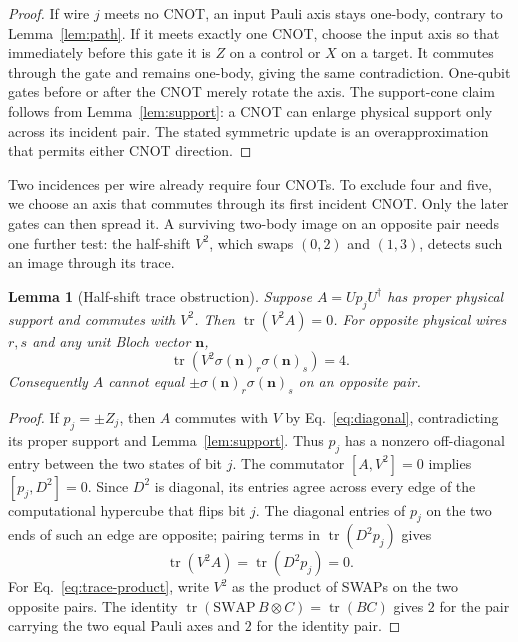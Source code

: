 \documentclass[11pt]{article}
\newtheorem{lemma}{Lemma}
\newcommand{\tr}{\operatorname{tr}}
\begin{document}
\begin{proof}
If wire $j$ meets no CNOT, an input Pauli axis stays one-body, contrary
to Lemma~\ref{lem:path}.  If it meets exactly one CNOT, choose the input
axis so that immediately before this gate it is $Z$ on a control or $X$
on a target.  It commutes through the gate and remains one-body, giving
the same contradiction.  One-qubit gates before or after the CNOT merely
rotate the axis.  The support-cone claim follows from
Lemma~\ref{lem:support}: a CNOT can enlarge physical support only across
its incident pair.  The stated symmetric update is an overapproximation
that permits either CNOT direction.
\end{proof}

Two incidences per wire already require four CNOTs. To exclude four and
five, we choose an axis that commutes through its first incident CNOT.
Only the later gates can then spread it. A surviving two-body image on
an opposite pair needs one further test: the half-shift $V^2$, which
swaps $(0,2)$ and $(1,3)$, detects such an image through its trace.

\begin{lemma}[Half-shift trace obstruction]\label{lem:trace}
Suppose $A=Up_jU^\dagger$ has proper physical support and commutes with
$V^2$.  Then $\tr(V^2A)=0$.  For opposite physical wires $r,s$ and any
unit Bloch vector $\mathbf n$,
\begin{equation}\label{eq:trace-product}
\tr\!\left(V^2\sigma(\mathbf n)_r\sigma(\mathbf n)_s\right)=4.
\end{equation}
Consequently $A$ cannot equal
$\pm\sigma(\mathbf n)_r\sigma(\mathbf n)_s$ on an opposite pair.
\end{lemma}

\begin{proof}
If $p_j=\pm Z_j$, then $A$ commutes with $V$ by
Eq.~\eqref{eq:diagonal}, contradicting its proper support and
Lemma~\ref{lem:support}.  Thus $p_j$ has a nonzero off-diagonal entry
between the two states of bit $j$.  The commutator $[A,V^2]=0$ implies
$[p_j,D^2]=0$.  Since $D^2$ is diagonal, its entries agree across every
edge of the computational hypercube that flips bit $j$.  The diagonal
entries of $p_j$ on the two ends of such an edge are opposite; pairing
terms in $\tr(D^2p_j)$ gives
\begin{equation}\label{eq:trace-zero}
\tr(V^2A)=\tr(D^2p_j)=0.
\end{equation}
For Eq.~\eqref{eq:trace-product}, write $V^2$ as the product of SWAPs
on the two opposite pairs.  The identity
$\tr(\mathrm{SWAP}\, B\otimes C)=\tr(BC)$ gives $2$ for the pair
carrying the two equal Pauli axes and $2$ for the identity pair.
\end{proof}
\end{document}
